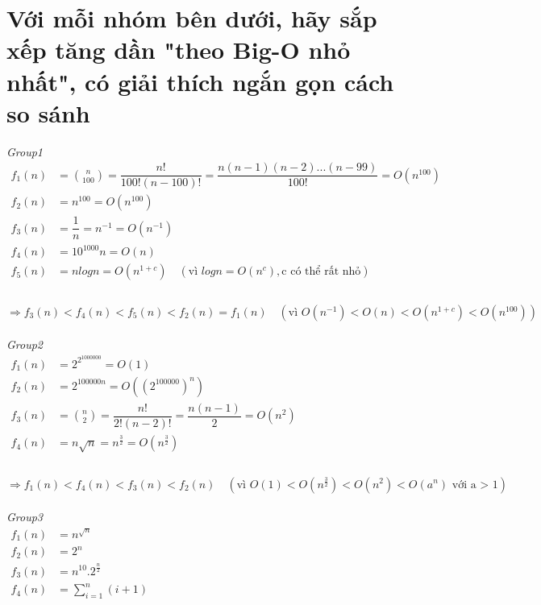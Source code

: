 \documentclass[12pt, letterpaper]{article}
\begin{document}
\section{Với mỗi nhóm bên dưới, hãy sắp xếp tăng dần "theo Big-O nhỏ nhất", có giải thích ngắn gọn cách so sánh}
\textit{Group1}\\
$\begin{aligned}
    f_1(n) &= \binom{n}{100} = \dfrac{n!}{100!(n-100)!} = \dfrac{n(n-1)(n-2)...(n-99)}{100!} = O(n^{100}) \\
    f_2(n) &= n^{100} = O(n^{100}) \\
    f_3(n) &= \dfrac{1}{n} = n^{-1} = O(n^{-1}) \\
    f_4(n) &= 10^{1000} n = O(n) \\
    f_5(n) &= nlogn = O(n^{1 + c}) \quad (\text{vì } logn = O(n^c), \text{c có thể rất nhỏ}) \\
\end{aligned}$ \\ \\
$\Rightarrow f_3(n) < f_4(n) < f_5(n) < f_2(n) = f_1(n) \quad (\text{vì } O(n^{-1}) < O(n) < O(n^{1+c}) < O(n^{100}))$\\ \\
\textit{Group2}\\
$\begin{aligned}
    f_1(n) &= 2^{2^{1000000}} = O(1) \\
    f_2(n) &= 2^{100000n} = O((2^{100000})^n) \\
    f_3(n) &= \binom{n}{2} = \dfrac{n!}{2!(n-2)!} = \dfrac{n(n-1)}{2} = O(n^2) \\
    f_4(n) &= n\sqrt{n} = n^{\frac{3}{2}} = O(n^{\frac{3}{2}})\\
\end{aligned}$ \\ \\
$\Rightarrow f_1(n) < f_4(n) < f_3(n) < f_2(n) \quad (\text{vì } O(1) < O(n^{\frac{3}{2}}) < O(n^2) < O(a^n) \text{ với a > 1})$\\ \\
\textit{Group3}\\
$\begin{aligned}
    f_1(n) &= n^{\sqrt{n}} \\
    f_2(n) &= 2^n \\
    f_3(n) &= n^{10}.2^{\frac{n}{2}} \\
    f_4(n) &= \sum_{i=1}^{n} (i+1) \\
\end{aligned}$ \\
\end{document}
